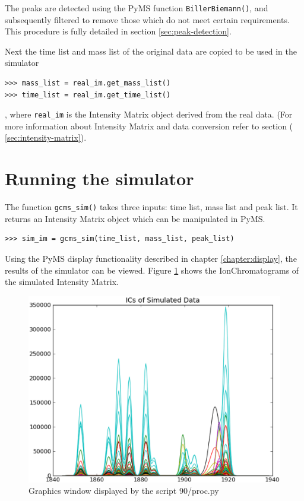The peaks are detected using the PyMS function {\tt BillerBiemann()}, and subsequently
filtered to remove those which do not meet certain requirements. This procedure is
fully detailed in section \ref{sec:peak-detection}.

Next the time list and mass list of the original data are copied to be used in the
simulator 
\begin{verbatim}
>>> mass_list = real_im.get_mass_list()
>>> time_list = real_im.get_time_list()
\end{verbatim}

, where {\tt real\_im} is the Intensity Matrix object derived from the real data. (For
more information about Intensity Matrix and data conversion refer to section (
\ref{sec:intensity-matrix}).

\section{Running the simulator}
The function {\tt gcms\_sim()} takes three inputs: time list, mass list and peak list.
It returns an Intensity Matrix object which can be manipulated in PyMS.

\begin{verbatim}
>>> sim_im = gcms_sim(time_list, mass_list, peak_list)
\end{verbatim}

Using the PyMS display functionality described in chapter \ref{chapter:display}, the results of 
the simulator can be viewed. Figure \ref{fig:no-noise} shows the IonChromatograms of the 
simulated Intensity Matrix.

\begin{figure}[h]
  \begin{center}
    \includegraphics[scale=0.25]{graphics/chapter09/test-90.eps}
  \end{center}
  \caption{Graphics window displayed by the script 90/proc.py}
  \label{fig:no-noise}
\end{figure}

